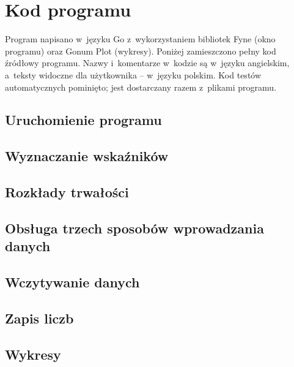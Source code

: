 \section{Kod programu}

Program napisano w~języku Go \cite{go} z~wykorzystaniem bibliotek Fyne \cite{fyne}
(okno programu) oraz Gonum Plot \cite{gonum} (wykresy). Poniżej zamieszczono pełny
kod źródłowy programu. Nazwy i~komentarze w~kodzie są w~języku angielskim, a~teksty
widoczne dla użytkownika -- w~języku polskim. Kod testów automatycznych pominięto;
jest dostarczany razem z~plikami programu.

\subsection{Uruchomienie programu}

\subsection{Wyznaczanie wskaźników}

\subsection{Rozkłady trwałości}

\subsection{Obsługa trzech sposobów wprowadzania danych}

\subsection{Wczytywanie danych}

\subsection{Zapis liczb}

\subsection{Wykresy}

